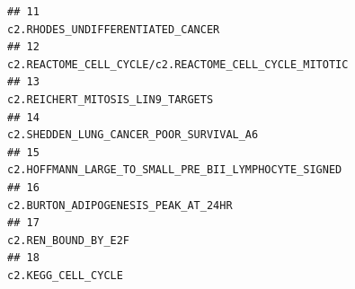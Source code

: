\documentclass{article}\usepackage[]{graphicx}\usepackage[]{color}
\makeatletter
\newenvironment{kframe}{%
 \def\at@end@of@kframe{}%
 \ifinner\ifhmode%
  \def\at@end@of@kframe{\end{minipage}}%
  \begin{minipage}{\columnwidth}%
 \fi\fi%
 \def\FrameCommand##1{\hskip\@totalleftmargin \hskip-\fboxsep
 \colorbox{shadecolor}{##1}\hskip-\fboxsep
     \hskip-\linewidth \hskip-\@totalleftmargin \hskip\columnwidth}%
 \MakeFramed {\advance\hsize-\width
   \@totalleftmargin\z@ \linewidth\hsize
   \@setminipage}}%
 {\par\unskip\endMakeFramed%
 \at@end@of@kframe}
\newenvironment{knitrout}{}{} %
\makeatother
\begin{document}
\begin{knitrout}
\begin{kframe}
\begin{verbatim}
## 11                                                                                                                                                                                                                                                                                                                      c2.RHODES_UNDIFFERENTIATED_CANCER
## 12                                                                                                                                                                                                                                                                                                  c2.REACTOME_CELL_CYCLE/c2.REACTOME_CELL_CYCLE_MITOTIC
## 13                                                                                                                                                                                                                                                                                                                       c2.REICHERT_MITOSIS_LIN9_TARGETS
## 14                                                                                                                                                                                                                                                                                                                c2.SHEDDEN_LUNG_CANCER_POOR_SURVIVAL_A6
## 15                                                                                                                                                                                                                                                                                                   c2.HOFFMANN_LARGE_TO_SMALL_PRE_BII_LYMPHOCYTE_SIGNED
## 16                                                                                                                                                                                                                                                                                                                    c2.BURTON_ADIPOGENESIS_PEAK_AT_24HR
## 17                                                                                                                                                                                                                                                                                                                                    c2.REN_BOUND_BY_E2F
## 18                                                                                                                                                                                                                                                                                                                                     c2.KEGG_CELL_CYCLE

\end{verbatim}
\end{kframe}
\end{knitrout}
\end{document}
